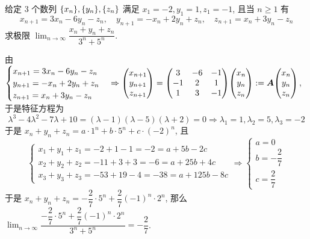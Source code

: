\begin{example}
    给定 3 个数列 $\qty{x_n},\qty{y_n},\qty{z_n}$ 满足 $x_1=-2,y_1=1,z_1=-1$, 且当 $n\geqslant 1$ 有
    $$x_{n+1}=3x_n-6y_n-z_n,\quad y_{n+1}=-x_n+2y_n+z_n,\quad z_{n+1}=x_n+3y_n-z_n$$
    求极限 $\displaystyle\lim_{n\to\infty}\dfrac{x_n+y_n+z_n}{3^n+5^n}.$
\end{example}
\begin{solution}
    由 $\begin{cases}
            x_{n+1}=3x_n-6y_n-z_n \\
            y_{n+1}=-x_n+2y_n+z_n \\
            z_{n+1}=x_n+3y_n-z_n
        \end{cases}\Rightarrow \mqty(x_{n+1}\\y_{n+1}\\z_{n+1})=\mqty(3&-6&-1\\-1&2&1\\1&3&-1)\mqty(x_{n}\\y_n\\z_n):=\vb*{A}\mqty(x_{n}\\y_n\\z_n)$, 于是特征方程为
    $$\lambda^3-4\lambda^2-7\lambda+10=(\lambda-1)(\lambda-5)(\lambda+2)=0\Rightarrow \lambda_1=1,\lambda_2=5,\lambda_3=-2$$
    于是 $x_n+y_n+z_n=a\cdot 1^n+b\cdot 5^n+c\cdot (-2)^n$, 且
    $$\begin{cases}
            x_1+y_1+z_1=-2+1-1=-2=a+5b-2c   \\
            x_2+y_2+z_2=-11+3+3=-6=a+25b+4c \\
            x_3+y_3+z_3=-53+19-4=-38=a+125b-8c
        \end{cases}\Rightarrow \begin{cases}
            a=0             \\
            b=-\dfrac{2}{7} \\[6pt]
            c=\dfrac{2}{7}
        \end{cases}$$
    于是 $x_n+y_n+z_n=-\dfrac{2}{7}\cdot 5^n+\dfrac{2}{7}(-1)^n\cdot 2^n$, 那么 $\displaystyle\lim_{n\to\infty}\dfrac{-\dfrac{2}{7}\cdot 5^n+\dfrac{2}{7}(-1)^n\cdot 2^n}{3^n+5^n}=-\dfrac{2}{7}$.
\end{solution}


